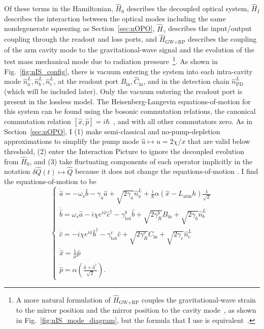 Of these terms in the Hamiltonian, $\hat H_0$ describes the decoupled optical system, $\hat H_I$ describes the interaction between the optical modes including the same nondegenerate squeezing as Section~\ref{sec:nOPO}, $\hat H_\gamma$ describes the input/output coupling through the readout and loss ports, and $\hat H_\text{GW+RP}$ describes the coupling of the arm cavity mode to the gravitational-wave signal and the evolution of the test mass mechanical mode due to radiation pressure~\footnote{A more natural formulation of $\hat H_\text{GW+RP}$ couples the gravitational-wave strain to the mirror position and the mirror position to the cavity mode~\cite{}, as shown in Fig.~\ref{fig:nIS_mode_diagram}, but the formula that I use is equivalent~\cite{}.}.
As shown in Fig.~\ref{fig:nIS_config}, there is vacuum entering the system into each intra-cavity mode $\hat n^L_a, \hat n^L_b, \hat n^L_c$, at the readout port $\hat B_\text{in}, \hat C_\text{in}$, and in the detection chain $\hat n^L_\text{PD}$ (which will be included later). Only the vacuum entering the readout port is present in the lossless model.
The Heisenberg-Langevin equations-of-motion for this system can be found using the bosonic commutation relations, the canonical commutation relation $[\hat x,\hat p]=i\hbar$~\cite{}, and with all other commutators zero. As in Section~\ref{sec:nOPO}, I (1) make semi-classical and no-pump-depletion approximations to simplify the pump mode $\hat u\mapsto u=2\chi/x$ that are valid below threshold, (2) enter the Interaction Picture to ignore the decoupled evolution from $\hat H_0$, and (3) take fluctuating components of each operator implicitly in the notation $\delta\hat{Q}(t)\mapsto\hat{Q}$ because it does not change the equations-of-motion . I find the equations-of-motion to be 
\begin{equation}\label{eq:nIS_EoM}
\begin{cases}
\dot{\hat{a}}=-\omega_s\hat{b} - \gamma_a \hat{a} + \sqrt{2\gamma_a}\hat{n}^L_a+\frac{i}{\hbar}\alpha(\hat{x}-L_\mathrm{arm}h)\frac{1}{\sqrt{2}}\\
\dot{\hat{b}}=\omega_s\hat{a} - i\chi e^{i\phi}\hat{c}^\dagger - \gamma^b_\mathrm{tot} \hat{b} + \sqrt{2\gamma^b_R}\hat{B}_\mathrm{in} + \sqrt{2\gamma_b}\hat{n}^L_b\\
\dot{\hat{c}}=-i\chi e^{i\phi}\hat{b}^\dagger - \gamma^c_\mathrm{tot} \hat{c} + \sqrt{2\gamma^c_R}\hat{C}_\mathrm{in} + \sqrt{2\gamma_c}\hat{n}^L_c\\
\dot{\hat{x}}=\frac{1}{\mu}\hat{p}\\
\dot{\hat{p}}=\alpha\left(\frac{\hat{a}+\hat{a}^\dag}{\sqrt{2}}\right).
\end{cases}
\end{equation}
